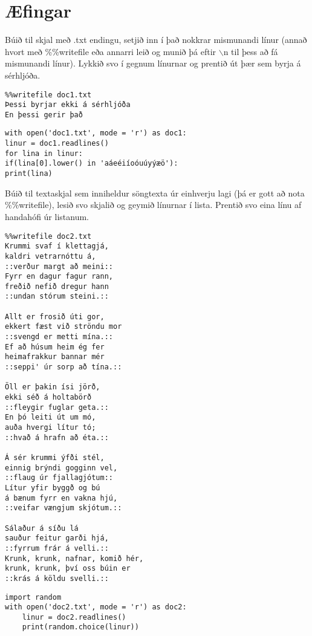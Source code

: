 \newpage
\section{Æfingar}

\begin{exercise}\label{doc1}
Búið til skjal með .txt endingu, setjið inn í það nokkrar mismunandi línur (annað hvort með \%\%writefile eða annarri leið og munið þá eftir $\backslash$n til þess að fá mismunandi línur).
Lykkið svo í gegnum línurnar og prentið út þær sem byrja á sérhljóða.
\end{exercise}
\begin{Answer}[ref={doc1}]

	\begin{lstlisting}
%%writefile doc1.txt
Þessi byrjar ekki á sérhljóða
En þessi gerir það
\end{lstlisting}
\begin{lstlisting}
with open('doc1.txt', mode = 'r') as doc1:
linur = doc1.readlines()
for lina in linur:
if(lina[0].lower() in 'aáeéiíoóuúyýæö'):
print(lina)\end{lstlisting}
\end{Answer}


\begin{exercise}\label{doc2}
Búið til textaskjal sem inniheldur söngtexta úr einhverju lagi (þá er gott að nota \%\%writefile), lesið svo skjalið og geymið línurnar í lista.
Prentið svo eina línu af handahófi úr listanum.
\end{exercise}
\begin{Answer}[ref={doc2}]
	\begin{lstlisting}
%%writefile doc2.txt
Krummi svaf í klettagjá,
kaldri vetrarnóttu á,
::verður margt að meini::
Fyrr en dagur fagur rann,
freðið nefið dregur hann
::undan stórum steini.::

Allt er frosið úti gor,
ekkert fæst við ströndu mor
::svengd er metti mína.::
Ef að húsum heim ég fer
heimafrakkur bannar mér
::seppi' úr sorp að tína.::

Öll er þakin ísi jörð,
ekki séð á holtabörð
::fleygir fuglar geta.::
En þó leiti út um mó,
auða hvergi lítur tó;
::hvað á hrafn að éta.::

Á sér krummi ýfði stél,
einnig brýndi gogginn vel,
::flaug úr fjallagjótum::
Lítur yfir byggð og bú
á bænum fyrr en vakna hjú,
::veifar vængjum skjótum.::

Sálaður á síðu lá
sauður feitur garði hjá,
::fyrrum frár á velli.::
Krunk, krunk, nafnar, komið hér,
krunk, krunk, því oss búin er
::krás á köldu svelli.::		
\end{lstlisting}
	\begin{lstlisting}
import random 
with open('doc2.txt', mode = 'r') as doc2:
	linur = doc2.readlines()
	print(random.choice(linur))
\end{lstlisting}
\end{Answer}